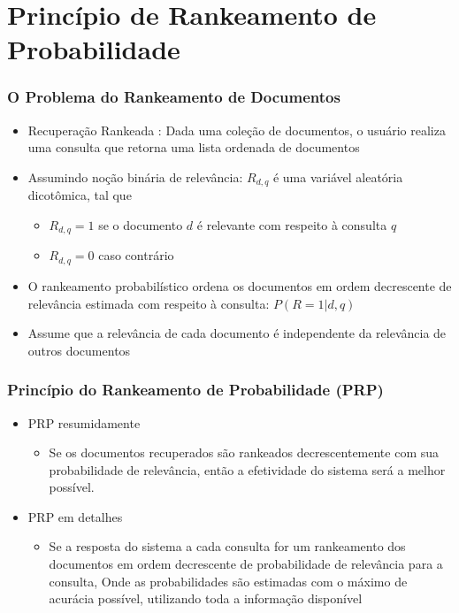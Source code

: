 \documentclass[compress]{beamer}
\def\myblue#1{\textcolor{texblue}{#1}}
\begin{document}
\section{Princípio de Rankeamento de Probabilidade}
\begin{frame}[<+->]
\frametitle{O Problema do Rankeamento de Documentos}
\pause[2]

\begin{itemize}
\item Recuperação Rankeada : Dada uma coleção de documentos, o usuário realiza uma consulta que retorna uma lista ordenada de documentos

\item Assumindo noção binária de relevância: $R_{d,q}$ é uma variável aleatória dicotômica, tal que
\begin{itemize} 

\item $R_{d,q}=1$ se o documento $d$ é relevante com respeito à consulta $q$ %
\item $R_{d,q}=0$ caso contrário  
\end{itemize}

\item O rankeamento probabilístico ordena os documentos em ordem decrescente de relevância estimada com respeito à consulta: $P(R=1|d,q)$

\item Assume que a relevância de cada documento é independente da relevância de outros documentos

\end{itemize}
\end{frame}
\begin{frame}[<+->]
\frametitle{Princípio do Rankeamento de Probabilidade (PRP)}
\pause[2]

\begin{itemize}
\item PRP resumidamente 
\begin{itemize}	
\item Se os documentos recuperados são rankeados decrescentemente com sua probabilidade de relevância, então a efetividade do sistema será a melhor possível.
\end{itemize}
\end{itemize}
\begin{itemize}
\item PRP em detalhes
\begin{itemize}
\item Se a resposta do sistema a cada consulta for um rankeamento dos documentos em ordem decrescente de probabilidade de relevância para a consulta, \myblue{Onde as probabilidades são estimadas com o máximo de acurácia possível, utilizando toda a informação disponível} 
\end{itemize}
\end{itemize}

\end{frame}
\end{document}

